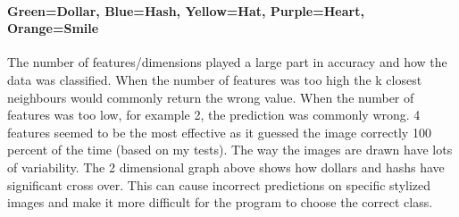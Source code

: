\documentclass[paper=a4, fontsize=12pt]{scrartcl}
\numberwithin{equation}{section}		%
\numberwithin{figure}{section}			%
\numberwithin{table}{section}				%
\begin{document}
\paragraph{     Green=Dollar, Blue=Hash, Yellow=Hat, Purple=Heart, Orange=Smile\newline
\newline}

  
The number of features/dimensions played a large part in accuracy and how the data was classified. When the number of features was too high the k closest neighbours would commonly return the wrong value. When the number of features was too low, for example 2, the prediction was commonly wrong. 4 features seemed to be the most effective as it guessed the image correctly 100 percent of the time (based on my tests). The way the images are drawn have lots of variability. The 2 dimensional graph above shows how dollars and hashs have significant cross over. This can cause incorrect predictions on specific stylized images and make it more difficult for the program to choose the correct class.



\end{document}
